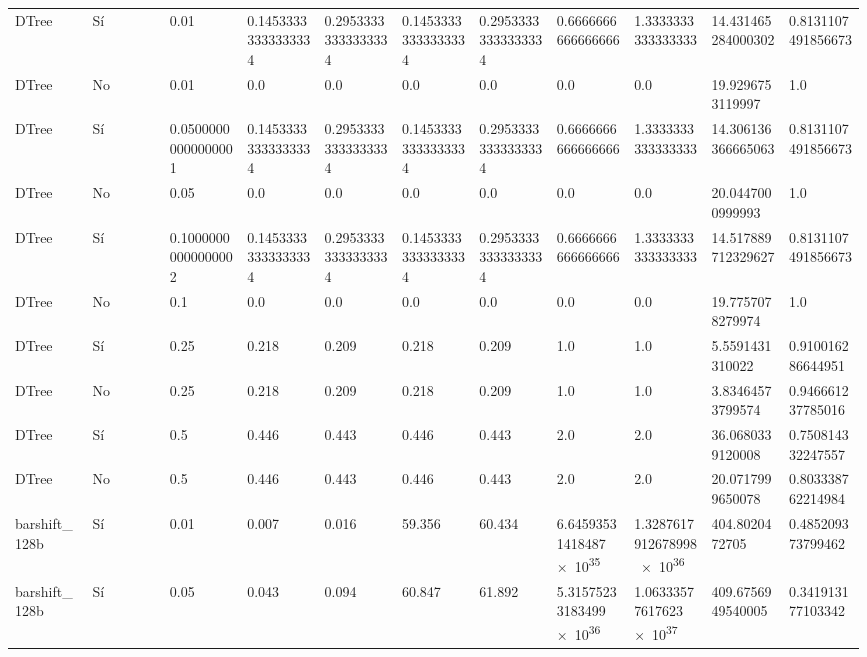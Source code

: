 {{\begin{longtable}{M{0.09\linewidth}M{0.09\linewidth}M{0.09\linewidth}M{0.09\linewidth}M{0.09\linewidth}M{0.09\linewidth}M{0.09\linewidth}M{0.09\linewidth}M{0.09\linewidth}M{0.09\linewidth}M{0.09\linewidth}}
DTree & Sí & \num{0.01} & \num{0.14533333333333334} & \num{0.29533333333333334} & \num{0.14533333333333334} & \num{0.29533333333333334} & \num{0.6666666666666666} & \num{1.3333333333333333} & \num{14.431465284000302} & \num{0.8131107491856673} \\
DTree & No & \num{0.01} & \num{0.0} & \num{0.0} & \num{0.0} & \num{0.0} & \num{0.0} & \num{0.0} & \num{19.9296753119997} & \num{1.0} \\
DTree & Sí & \num{0.05000000000000001} & \num{0.14533333333333334} & \num{0.29533333333333334} & \num{0.14533333333333334} & \num{0.29533333333333334} & \num{0.6666666666666666} & \num{1.3333333333333333} & \num{14.306136366665063} & \num{0.8131107491856673} \\
DTree & No & \num{0.05} & \num{0.0} & \num{0.0} & \num{0.0} & \num{0.0} & \num{0.0} & \num{0.0} & \num{20.0447000999993} & \num{1.0} \\
DTree & Sí & \num{0.10000000000000002} & \num{0.14533333333333334} & \num{0.29533333333333334} & \num{0.14533333333333334} & \num{0.29533333333333334} & \num{0.6666666666666666} & \num{1.3333333333333333} & \num{14.517889712329627} & \num{0.8131107491856673} \\
DTree & No & \num{0.1} & \num{0.0} & \num{0.0} & \num{0.0} & \num{0.0} & \num{0.0} & \num{0.0} & \num{19.7757078279974} & \num{1.0} \\
DTree & Sí & \num{0.25} & \num{0.218} & \num{0.209} & \num{0.218} & \num{0.209} & \num{1.0} & \num{1.0} & \num{5.5591431310022} & \num{0.910016286644951} \\
DTree & No & \num{0.25} & \num{0.218} & \num{0.209} & \num{0.218} & \num{0.209} & \num{1.0} & \num{1.0} & \num{3.83464573799574} & \num{0.946661237785016} \\
DTree & Sí & \num{0.5} & \num{0.446} & \num{0.443} & \num{0.446} & \num{0.443} & \num{2.0} & \num{2.0} & \num{36.0680339120008} & \num{0.750814332247557} \\
DTree & No & \num{0.5} & \num{0.446} & \num{0.443} & \num{0.446} & \num{0.443} & \num{2.0} & \num{2.0} & \num{20.0717999650078} & \num{0.803338762214984} \\
barshift\_128b & Sí & \num{0.01} & \num{0.007} & \num{0.016} & \num{59.356} & \num{60.434} & \num{6.64593531418487e+35} & \num{1.3287617912678998e+36} & \num{404.8020472705} & \num{0.485209373799462} \\
barshift\_128b & Sí & \num{0.05} & \num{0.043} & \num{0.094} & \num{60.847} & \num{61.892} & \num{5.31575233183499e+36} & \num{1.06333577617623e+37} & \num{409.6756949540005} & \num{0.341913177103342} \\

\end{longtable}}}

